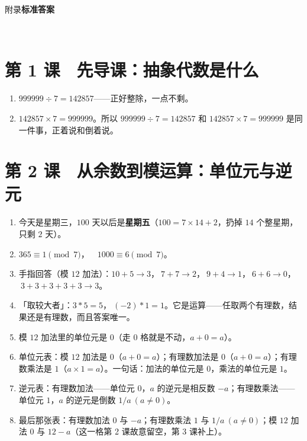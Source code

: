 
\clearpage
{}
{}%
\renewcommand{\xhcurrentlesson}{附录　标准答案}%
%
\vspace*{0.3cm}%
\noindent\colorbox{xhteal!12}{%
  \parbox[c][1.25cm][c]{\linewidth}{%
    \centering
    {\heiti\fontsize{14pt}{20pt}\selectfont\color{xhteal} 附录\quad\textbf{标准答案}}%
  }%
}\\[10pt]

\section*{第 1 课　先导课：抽象代数是什么}
\begin{enumerate}
  \item \(999999\div7=142857\)——正好整除，一点不剩。
  \item \(142857\times7=999999\)。所以 \(999999\div7=142857\) 和 \(142857\times7=999999\) 是同一件事，正着说和倒着说。
\end{enumerate}

\section*{第 2 课　从余数到模运算：单位元与逆元}
\begin{enumerate}
  \item 今天是星期三，\(100\) 天以后是\textbf{星期五}（\(100=7\times14+2\)，扔掉 \(14\) 个整星期，只剩 \(2\) 天）。
  \item \(365\equiv1\pmod7\)，\(\quad1000\equiv6\pmod7\)。
  \item 手指回答（模 \(12\) 加法）：\(10+5\to3\)，\(\ 7+7\to2\)，\(\ 9+4\to1\)，\(\ 6+6\to0\)，\(\ 3+3+3+3+3\to3\)。
  \item 「取较大者」：\(3*5=5\)，\(\ (-2)*1=1\)。它是运算——任取两个有理数，结果还是有理数，而且答案唯一。
  \item 模 \(12\) 加法里的单位元是 \(0\)（走 \(0\) 格就是不动，\(a+0=a\)）。
  \item 单位元表：模 \(12\) 加法是 \(0\)（\(a+0=a\)）；有理数加法是 \(0\)（\(a+0=a\)）；有理数乘法是 \(1\)（\(a\times1=a\)）。一句话：加法的单位元是 \(0\)，乘法的单位元是 \(1\)。
  \item 逆元表：有理数加法——单位元 \(0\)，\(a\) 的逆元是相反数 \(-a\)；有理数乘法——单位元 \(1\)，\(a\) 的逆元是倒数 \(1/a\ (a\neq0)\)。
  \item 最后那张表：有理数加法 \(0\) 与 \(-a\)；有理数乘法 \(1\) 与 \(1/a\ (a\neq0)\)；模 \(12\) 加法 \(0\) 与 \(12-a\)（这一格第 2 课故意留空，第 3 课补上）。
\end{enumerate}

